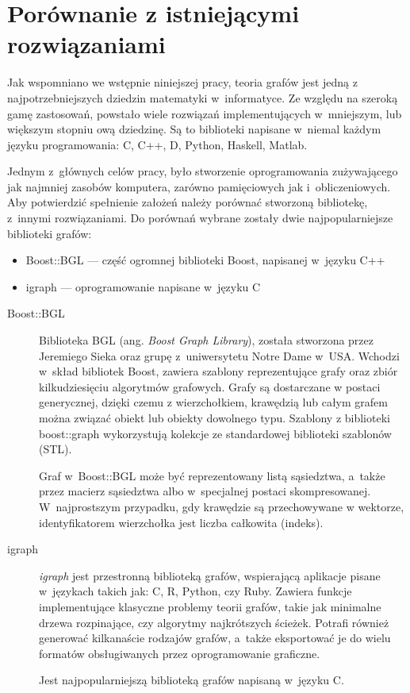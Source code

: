 \documentclass[a4paper,12pt,polish,oneside,openright]{thesis}
\begin{document}
\chapter{Porównanie z istniejącymi rozwiązaniami}
\label{chap:tests}
Jak wspomniano we wstępnie niniejszej pracy, teoria grafów jest jedną z najpotrzebniejszych dziedzin matematyki w~informatyce.
Ze względu na szeroką gamę zastosowań, powstało wiele rozwiązań implementujących w~mniejszym, lub większym stopniu ową dziedzinę.
Są to biblioteki napisane w~niemal każdym języku programowania: C, C++, D, Python, Haskell, Matlab.

Jednym z~głównych celów pracy, było stworzenie oprogramowania zużywającego jak najmniej zasobów komputera, zarówno pamięciowych jak i~obliczeniowych.
Aby potwierdzić spełnienie założeń należy porównać stworzoną bibliotekę, z~innymi rozwiązaniami.
Do porównań wybrane zostały dwie najpopularniejsze biblioteki grafów:
\begin{itemize}
	\item Boost::BGL --- część ogromnej biblioteki Boost, napisanej w~języku C++
	\item igraph --- oprogramowanie napisane w~języku C
\end{itemize}

\begin{description}
\item[Boost::BGL]
Biblioteka BGL (ang. \emph{Boost Graph Library}), została stworzona przez Jeremiego Sieka oraz grupę z~uniwersytetu Notre Dame w~USA.
Wchodzi w~skład bibliotek Boost, zawiera szablony reprezentujące grafy oraz zbiór kilkudziesięciu algorytmów grafowych\cite{bgl}.
Grafy są dostarczane w postaci generycznej, dzięki czemu z wierzchołkiem, krawędzią lub całym grafem można związać obiekt lub obiekty dowolnego typu.
Szablony z biblioteki boost::graph wykorzystują kolekcje ze standardowej biblioteki szablonów (STL).

Graf w~Boost::BGL może być reprezentowany listą sąsiedztwa, a~także przez macierz sąsiedztwa albo w~specjalnej postaci skompresowanej.
W~najprostszym przypadku, gdy krawędzie są przechowywane w wektorze, identyfikatorem wierzchołka jest liczba całkowita (indeks).

\item[igraph]
\emph{igraph} jest przestronną biblioteką grafów, wspierającą aplikacje pisane w~językach takich jak: C, R, Python, czy Ruby.
Zawiera funkcje implementujące klasyczne problemy teorii grafów, takie jak minimalne drzewa rozpinające, czy algorytmy najkrótszych ścieżek.
Potrafi również generować kilkanaście rodzajów grafów, a~także eksportować je do wielu formatów obsługiwanych przez oprogramowanie graficzne\cite{igraph}.

Jest najpopularniejszą biblioteką grafów napisaną w~języku C.
\end{description}
\end{document}

